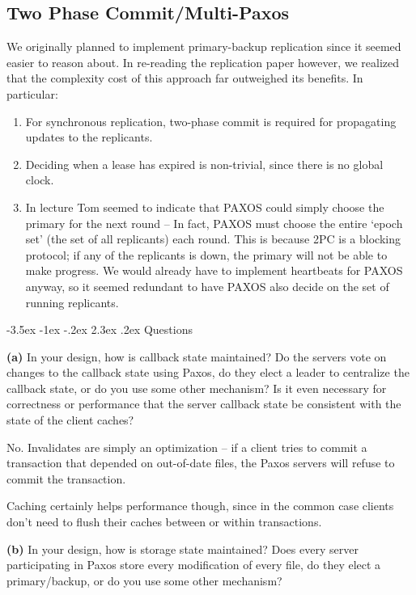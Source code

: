 \documentclass[12pt]{article}
\makeatletter
\renewcommand\section{\@startsection{section}{1}{\z@}%
								 {-3.5ex \@plus -1ex \@minus -.2ex}%
								 {2.3ex \@plus.2ex}%
								 {\normalfont\large\bfseries}}
\makeatother
\begin{document}
\subsection{Two Phase Commit/Multi-Paxos}

We originally planned to implement primary-backup replication since it seemed easier to reason
about. In re-reading the replication paper however, we realized that the complexity cost of
this approach far outweighed its benefits. In particular:
\begin{enumerate}
\item
    For synchronous replication, two-phase commit is required for propagating updates
    to the replicants.
\item
    Deciding when a lease has expired is non-trivial, since there is no global clock. 
\item
    In lecture Tom seemed to indicate that PAXOS could simply choose the primary for the
    next round -- In fact, PAXOS must choose the entire ‘epoch set’ (the set of all replicants)
    each round. This is because 2PC is a blocking protocol; if any of the replicants is down,
    the primary will not be able to make progress. We would already have to implement
    heartbeats for PAXOS anyway, so it seemed redundant to have PAXOS also decide on the
    set of running replicants.
\end{enumerate}

\section{Questions}

\noindent \textbf{(a)}
In your design, how is callback state maintained? Do the servers vote on changes to the
callback state using Paxos, do they elect a leader to centralize the callback state,
or do you use some other mechanism? Is it even necessary for correctness or performance
that the server callback state be consistent with the state of the client caches?

No.  Invalidates are simply an optimization -- if a client tries to commit a transaction
that depended on out-of-date files, the Paxos servers will refuse to commit the transaction.

Caching certainly helps performance though, since in the common case clients don’t need to
flush their caches between or within transactions.

\noindent \textbf{(b)}
In your design, how is storage state maintained? Does every server participating in Paxos 
store every modification of every file, do they elect a primary/backup, or do you use
some other mechanism?
\end{document}
